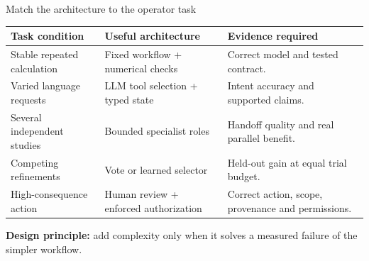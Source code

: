 \begin{frame}[t]{Match the architecture to the operator task}

\begin{tabular}{@{}>{\raggedright\arraybackslash}p{.30\linewidth}>{\raggedright\arraybackslash}p{.31\linewidth}>{\raggedright\arraybackslash}p{.31\linewidth}@{}}
\toprule Task condition & Useful architecture & Evidence required \\
\midrule
Stable repeated calculation & Fixed workflow + numerical checks & Correct model and tested contract. \\
Varied language requests & LLM tool selection + typed state & Intent accuracy and supported claims. \\
Several independent studies & Bounded specialist roles & Handoff quality and real parallel benefit. \\
Competing refinements & Vote or learned selector & Held-out gain at equal trial budget. \\
High-consequence action & Human review + enforced authorization & Correct action, scope, provenance and permissions. \\
\bottomrule
\end{tabular}\par
\par\medskip
\textbf{Design principle:} add complexity only when it solves a measured failure of the simpler workflow.

\end{frame}

